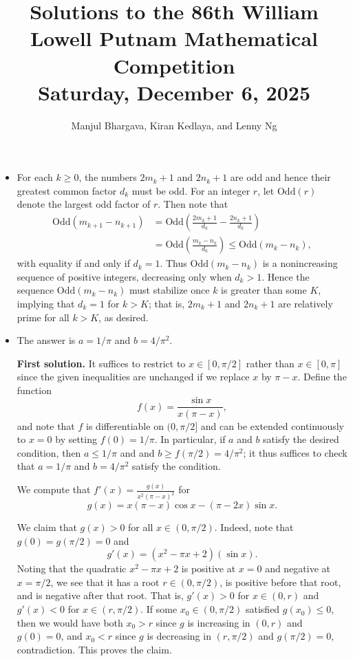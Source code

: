 \documentclass[amssymb,twocolumn,pra,10pt,aps]{revtex4-1}
\begin{document}
\title{Solutions to the 86th William Lowell Putnam Mathematical Competition \\
    Saturday, December 6, 2025}
\author{Manjul Bhargava, Kiran Kedlaya, and Lenny Ng}
\noaffiliation
\maketitle

\begin{itemize}
\item[A1]
For each $k\geq 0$, the numbers $2m_k+1$ and $2n_k+1$ are odd and hence their greatest common factor $d_k$ must be odd. For an integer $r$, let $\mathrm{Odd}(r)$ denote the largest odd factor of $r$. Then note that
\begin{align*}
\mathrm{Odd}(m_{k+1}-n_{k+1}) &= \mathrm{Odd}\left(\frac{2m_k+1}{d_k}-\frac{2n_k+1}{d_k}\right) \\
  &= \mathrm{Odd}\left(\frac{m_k-n_k}{d_k}\right) \leq \mathrm{Odd}(m_k-n_k),
\end{align*}
with equality if and only if $d_k=1$.
Thus $\mathrm{Odd}(m_k-n_k)$ is a nonincreasing sequence of positive integers, decreasing only when $d_k>1$. Hence the sequence $\mathrm{Odd}(m_k-n_k)$ must stabilize once $k$ is greater than some $K$, implying that $d_k=1$ for $k>K$; that is, $2m_k+1$ and $2n_k+1$ are relatively prime for all $k>K$, as desired.


\item[A2]
The answer is $a=1/\pi$ and $b=4/\pi^2$. 

\noindent
\textbf{First solution.}
It suffices to restrict to $x \in [0,\pi/2]$ rather than $x \in [0,\pi]$ since the given inequalities are unchanged if we replace $x$ by $\pi-x$. Define the function 
\[
f(x) = \frac{\sin x}{x(\pi-x)},
\]
and note that $f$
is differentiable on $(0,\pi/2]$ and can be extended continuously to $x=0$ by setting $f(0) = 1/\pi$.
In particular, if $a$ and $b$ satisfy the desired condition, then $a \leq 1/\pi$ and
and $b \geq f(\pi/2) = 4/\pi^2$; it thus suffices to check that $a = 1/\pi$ and $b = 4/\pi^2$ satisfy the condition.

 We compute that $f'(x) = \frac{g(x)}{x^2(\pi-x)^2}$ for
 \[
 g(x) = x(\pi-x)\cos x-(\pi-2x)\sin x.
\]

We claim that $g(x) > 0$ for all $x \in (0,\pi/2)$. Indeed, note that $g(0)=g(\pi/2)=0$ and
\[
g'(x) = (x^2-\pi x+2)(\sin x).
\]
Noting that the quadratic $x^2-\pi x+2$ is positive at $x=0$ and negative at $x=\pi/2$, we see that it has a root $r \in (0,\pi/2)$,
 is positive before that root, and is negative after that root. That is, $g'(x)>0$ for $x \in (0,r)$ and $g'(x)<0$ for $x \in (r,\pi/2)$. If some $x_0 \in (0,\pi/2)$ satisfied $g(x_0) \leq 0$, then we would have both $x_0>r$ since $g$ is increasing in $(0,r)$
 and $g(0)=0$, and $x_0<r$ since $g$ is decreasing in $(r,\pi/2)$ and $g(\pi/2)=0$, contradiction. This proves the claim.


\end{itemize}
\end{document}
